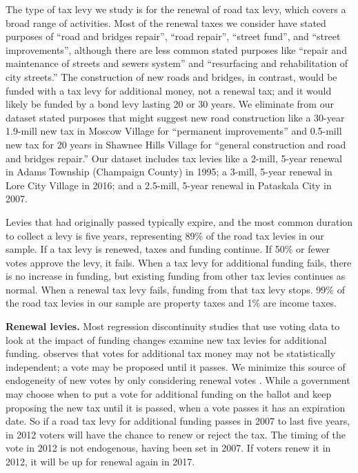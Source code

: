 The type of tax levy we study is for the renewal of road tax levy, which covers a broad range of activities. Most of the renewal taxes we consider have stated purposes of “road and bridges repair”, “road repair”, “street fund”, and “street improvements”, although there are less common stated purposes like “repair and maintenance of streets and sewers system” and “resurfacing and rehabilitation of city streets.”  The construction of new roads and bridges, in contrast, would be funded with a tax levy for additional money, not a renewal tax; and it would likely be funded by a bond levy lasting 20 or 30 years.  We eliminate from our dataset stated purposes that might suggest new road construction like a 30-year 1.9-mill new tax in Moscow Village for “permanent improvements” and 0.5-mill new tax for 20 years in Shawnee Hills Village for “general construction and road and bridges repair.” Our dataset includes tax levies like a 2-mill, 5-year renewal in Adams Township (Champaign County) in 1995; a 3-mill, 5-year renewal in Lore City Village in 2016; and a 2.5-mill, 5-year renewal in Pataskala City in 2007.

\noindent Levies that had originally passed typically expire, and the most common duration to collect a levy is five years, representing 89\% of the road tax levies in our sample.  If a tax levy is renewed, taxes and funding continue.  If 50\% or fewer votes approve the levy, it fails.  When a tax levy for additional funding fails, there is no increase in funding, but existing funding from other tax levies continues as normal.  When a renewal tax levy fails, funding from that tax levy stops.  99\% of the road tax levies in our sample are property taxes and 1\% are income taxes.

{\bf Renewal levies.} Most regression discontinuity studies that use voting data to look at the impact of funding changes examine new tax levies for additional funding.  \cite{cellini2010value} observes that votes for additional tax money may not be statistically independent; a vote may be proposed until it passes.  We minimize this source of endogeneity of new votes by only considering renewal votes \citep{brasington2017school}.  While a government may choose when to put a vote for additional funding on the ballot and keep proposing the new tax until it is passed, when a vote passes it has an expiration date.  So if a road tax levy for additional funding passes in 2007 to last five years, in 2012 voters will have the chance to renew or reject the tax.  The timing of the vote in 2012 is not endogenous, having been set in 2007.  If voters renew it in 2012, it will be up for renewal again in 2017. 

